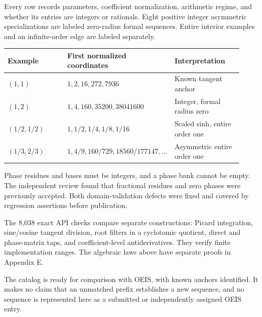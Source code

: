 Every row records parameters, coefficient normalization, arithmetic regime,
and whether its entries are integers or rationals. Eight positive integer
asymmetric specializations are labeled zero-radius formal sequences. Entire
interior examples and an infinite-order edge are labeled separately.

\begin{tabular}{@{}p{0.27\linewidth}p{0.35\linewidth}p{0.30\linewidth}@{}}
\toprule
Example & First normalized coordinates & Interpretation\\\midrule
$(1,1)$ & $1,2,16,272,7936$ & Known tangent anchor\\
$(1,2)$ & $1,4,160,35200,38041600$ & Integer, formal radius zero\\
$(1/2,1/2)$ & $1,1/2,1/4,1/8,1/16$ & Scaled sinh, entire order one\\
$(1/3,2/3)$ & $1,4/9,160/729,18560/177147,\ldots$ & Asymmetric entire order one\\
\bottomrule
\end{tabular}

Phase residues and bases must be integers, and a phase bank cannot be empty.
The independent review found that fractional residues and zero phases were
previously accepted. Both domain-validation defects were fixed and covered
by regression assertions before publication.

The 8,038 exact API checks compare separate constructions: Picard integration,
sine/cosine tangent division, root filters in a cyclotomic quotient,
direct and phase-matrix taps, and coefficient-level antiderivatives.
They verify finite implementation ranges. The algebraic laws above have
separate proofs in Appendix E.

The catalog is ready for comparison with OEIS, with known anchors identified.
It makes no claim that an unmatched prefix establishes a new sequence, and
no sequence is represented here as a submitted or independently assigned OEIS entry.
